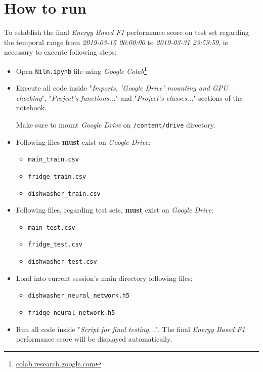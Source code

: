 \documentclass[sigconf]{acmart}
\begin{document}
\section{How to run}

To establish the final \textit{Energy Based F1} performance score on test set regarding the temporal range from \textit{2019-03-15 00:00:00} to \textit{2019-03-31 23:59:59}, is necessary to execute following steps:

\begin{itemize}
\item Open \texttt{Nilm.ipynb} file using \textit{Google Colab}\footnote{\url{colab.research.google.com}}

\item Execute all code inside "\textit{Imports, 'Google Drive' mounting and GPU checking}", "\textit{Project's functions...}" and "\textit{Project's classes...}" sections of the notebook. 

Make sure to mount \textit{Google Drive} on \texttt{/content/drive} directory.

\item Following files \textbf{must} exist on \textit{Google Drive}:
\begin{itemize}
\item \texttt{main\_train.csv}
\item \texttt{fridge\_train.csv}
\item \texttt{dishwasher\_train.csv}
\end{itemize}

\item Following files, regarding test sets, \textbf{must} exist on \textit{Google Drive}:
\begin{itemize}
\item \texttt{main\_test.csv}
\item \texttt{fridge\_test.csv}
\item \texttt{dishwasher\_test.csv}
\end{itemize}

\item Load into current session's main directory following files:
\begin{itemize}
\item \texttt{dishwasher\_neural\_network.h5}
\item \texttt{fridge\_neural\_network.h5}
\end{itemize}

\item Run all code inside "\textit{Script for final testing...}". The final \textit{Energy Based F1} performance score will be displayed automatically.
\end{itemize}



\end{document}
